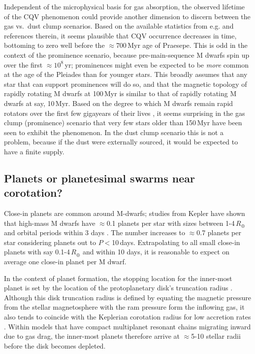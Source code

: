 \documentclass[11pt,twocolumn,tighten]{aastex63}
\begin{document}
Independent of the microphysical basis for gas absorption, the
observed lifetime of the CQV phenomenon could provide another
dimension to discern between the gas vs.~dust clump scenarios.
Based on the available statistics from e.g.
\citet{2022AJ....164...80R} and references therein, it seems plausible
that CQV occurrence decreases in time, bottoming to zero well before
the $\approx$700\,Myr age of Praesepe.  This is odd in the context of
the prominence scenario, because pre-main-sequence M dwarfs spin up
over the first $\approx$$10^8$\,yr; prominences might even be expected
to be {\it more} common at the age of the Pleiades than for younger
stars.  This broadly assumes that any star that can support
prominences will do so, and that the magnetic topology of rapidly
rotating M dwarfs at 100\,Myr is similar to that of rapidly rotating M
dwarfs at say, 10\,Myr.  Based on the degree to which M dwarfs remain
rapid rotators over the first few gigayears of their lives
\citep[e.g.][]{2022AJ....164...80R,2022ApJ...936..109P}, it seems
surprising in the gas clump (prominence) scenario that very few stars
older than 150\,Myr have been seen to exhibit the phenomenon.  In the
dust clump scenario this is not a problem, because if the dust were
externally sourced, it would be expected to have a finite supply.


\subsection{Planets or planetesimal swarms near corotation?}

Close-in planets are common around M-dwarfs; studies from Kepler have
shown that high-mass M  dwarfs have $\approx$0.1 planets per star with
sizes between 1-4\,$R_\oplus$ and orbital periods within 3 days
\citep{2015ApJ...807...45D}.  The number increases to $\approx$0.7
planets per star considering planets out to $P$$<$10\,days.
Extrapolating to all small close-in planets with say 0.1-4\,$R_\oplus$
and within 10 days, it is reasonable to expect on average one close-in
planet per M dwarf.

In the context of planet formation, the stopping location for the
inner-most planet is set by the location of the protoplanetary disk's
truncation radius \citep{2018haex.bookE.142I}.  Although this disk
truncation radius is defined by equating the magnetic pressure from
the stellar magnetosphere with the ram pressure form the inflowing
gas, it also tends to coincide with the Keplerian corotation radius
for low accretion rates
\citep{2016ARA&A..54..135H,2022MNRAS.510.5246L}.  Within models that
have compact multiplanet resonant chains migrating inward due to gas
drag, the inner-most planets therefore arrive at $\approx$5-10 stellar
radii before the disk becomes depleted.
\end{document}
